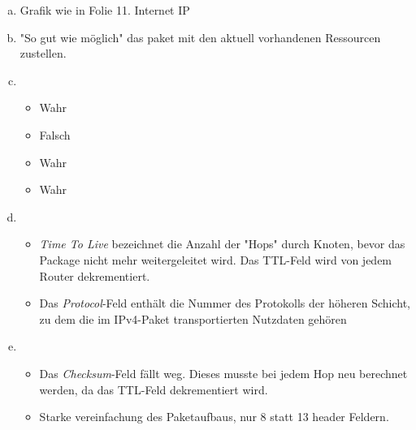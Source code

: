 

\usepackage{multicol,tabularx}
\usepackage{graphicx}
\usepackage{float}
\renewcommand{\arraystretch}{1.5}

\date{Mittwoch 4.12.2019}



\maketitle
\thispagestyle{fancy}


\begin{enumerate}[a)]
	\item Grafik wie in Folie 11. Internet IP
	\item "So gut wie möglich" das paket mit den aktuell vorhandenen Ressourcen zustellen.
	\item \begin{itemize}
		\item Wahr
		\item Falsch
		\item Wahr
		\item Wahr
	\end{itemize}
	\item \begin{itemize}
		\item \textit{Time To Live} bezeichnet die Anzahl der "Hops" durch Knoten, bevor das Package nicht mehr weitergeleitet wird. Das TTL-Feld wird von jedem Router dekrementiert.
		\item Das \textit{Protocol}-Feld enthält die Nummer des Protokolls der höheren Schicht, zu dem die im IPv4-Paket transportierten Nutzdaten gehören
	\end{itemize}
	\item \begin{itemize}
		\item Das \textit{Checksum}-Feld fällt weg. Dieses musste bei jedem Hop neu berechnet werden, da das TTL-Feld dekrementiert wird.
		\item Starke vereinfachung des Paketaufbaus, nur 8 statt 13 header Feldern.
	\end{itemize}
\end{enumerate}



